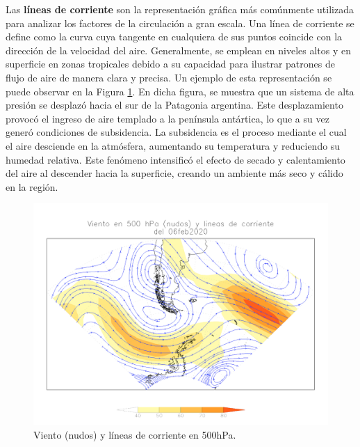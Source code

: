Las \textbf{líneas de corriente} \cite{recordAntarticos2024} son la representación gráfica más comúnmente utilizada para analizar los factores de la circulación a gran escala. Una línea de corriente se define como la curva cuya tangente en cualquiera de sus puntos coincide con la dirección de la velocidad del aire. Generalmente, se emplean en niveles altos y en superficie en zonas tropicales debido a su capacidad para ilustrar patrones de flujo de aire de manera clara y precisa. Un ejemplo de esta representación se puede observar en la Figura \ref{fig:mapaLineas}. En dicha figura, se muestra que un sistema de alta presión se desplazó hacia el sur de la Patagonia argentina. Este desplazamiento provocó el ingreso de aire templado a la península antártica, lo que a su vez generó condiciones de subsidencia. La subsidencia es el proceso mediante el cual el aire desciende en la atmósfera, aumentando su temperatura y reduciendo su humedad relativa. Este fenómeno intensificó el efecto de secado y calentamiento del aire al descender hacia la superficie, creando un ambiente más seco y cálido en la región.


\begin{figure}[H]
    \centering
    \includegraphics[width=1\linewidth]{Figuras/viento/mapalineasViento.png}
    \caption{Viento (nudos) y líneas de corriente en 500\unit{\hecto\pascal}. \cite{recordAntarticos2024}}
    \label{fig:mapaLineas}
\end{figure}


